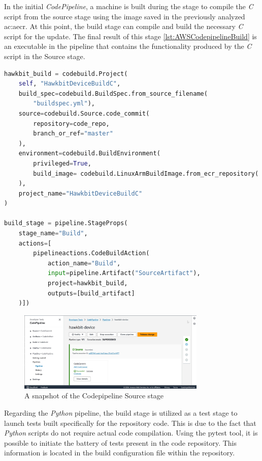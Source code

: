 In the initial \textit{CodePipeline}, a machine is built during the stage to compile the \textit{C} script from the source stage using the image saved in the previously analyzed \gls{ac:aecr}. At this point, the build stage can compile and build the necessary \textit{C} script for the update. The final result of this stage \ref{lst:AWSCodepipelineBuild} is an executable in the pipeline that contains the functionality produced by the \textit{C} script in the Source stage.
\begin{lstlisting}[language=Python, caption={CDK Code for the Codecommit build stage set up}, label=lst:AWSCodepipelineBuild]
hawkbit_build = codebuild.Project(
    self, "HawkbitDeviceBuildC",
    build_spec=codebuild.BuildSpec.from_source_filename(
        "buildspec.yml"),
    source=codebuild.Source.code_commit(
        repository=code_repo,
        branch_or_ref="master"
    ),
    environment=codebuild.BuildEnvironment(
        privileged=True,
        build_image= codebuild.LinuxArmBuildImage.from_ecr_repository( ecr_repository, "v1")
    ),
    project_name="HawkbitDeviceBuildC"
)

build_stage = pipeline.StageProps(
    stage_name="Build",
    actions=[
        pipelineactions.CodeBuildAction(
            action_name="Build",
            input=pipeline.Artifact("SourceArtifact"),
            project=hawkbit_build,
            outputs=[build_artifact]
    )])
\end{lstlisting}
\begin{figure}[h]  %
    \centering
    \includegraphics[width=0.8\textwidth]{images/hawkbitCodepipeline.png}  %
    \caption{A snapshot of the Codepipeline Source stage}
    \label{fig:HawkbitCodepipeline}
\end{figure}

Regarding the \textit{Python} pipeline, the build stage is utilized as a test stage to launch tests built specifically for the repository code. This is due to the fact that \textit{Python} scripts do not require actual code compilation. Using the pytest tool, it is possible to initiate the battery of tests present in the code repository. This information is located in the build configuration file within the repository.

